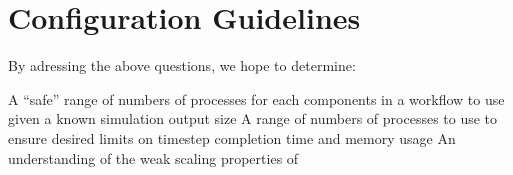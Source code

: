 \section{Configuration Guidelines}
\label{s:guidelines}
\noindent
By adressing the above questions, we hope to determine:
\begin{outline}
  \1 A ``safe'' range of numbers of processes for each \sys components in a workflow 
  to use given a known simulation output size
  \1 A range of numbers of processes to use to ensure desired limits on timestep completion time and memory usage
  \1 An understanding of the weak scaling properties of \sys
\end{outline}
